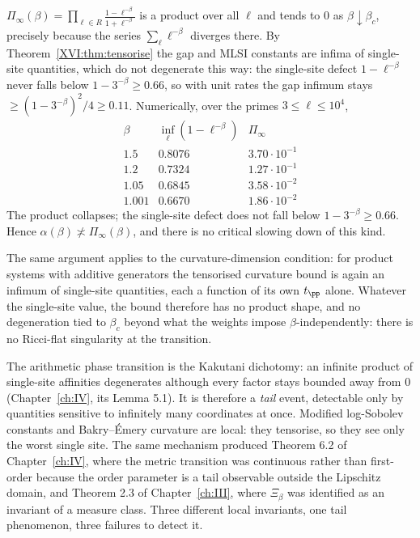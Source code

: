 \begin{corollary}\label{XVI:cor:wrongshape}
$\Pi_\infty(\beta)=\prod_{\ell\in R}\frac{1-\ell^{-\beta}}{1+\ell^{-\beta}}$ is a product over
all $\ell$ and tends to $0$ as $\beta\downarrow\beta_c$, precisely because the series
$\sum_\ell\ell^{-\beta}$ diverges there. By Theorem~\ref{XVI:thm:tensorise} the gap and MLSI
constants are infima of single-site quantities, which do not degenerate this way: the
single-site defect $1-\ell^{-\beta}$ never falls below $1-3^{-\beta}\ge0.66$, so with unit
rates the gap infimum stays $\ge(1-3^{-\beta})^2/4\ge0.11$. Numerically, over the primes
$3\le\ell\le10^4$,
\[
\begin{array}{lcc}
\beta & \inf_\ell(1-\ell^{-\beta}) & \Pi_\infty\\\hline
1.5 & 0.8076 & 3.70\cdot10^{-1}\\
1.2 & 0.7324 & 1.27\cdot10^{-1}\\
1.05 & 0.6845 & 3.58\cdot10^{-2}\\
1.001 & 0.6670 & 1.86\cdot10^{-2}
\end{array}
\]
The product collapses; the single-site defect does not fall below $1-3^{-\beta}\ge0.66$.
Hence $\alpha(\beta)\not\asymp\Pi_\infty(\beta)$, and there is no critical slowing down of
this kind.
\end{corollary}

\begin{corollary}\label{XVI:cor:BE}
The same argument applies to the curvature-dimension condition: for product systems with
additive generators the tensorised curvature bound is again an infimum of single-site
quantities, each a function of its own $t_\pp$ alone. Whatever the single-site value, the
bound therefore has no product shape, and no degeneration tied to $\beta_c$ beyond what the
weights impose $\beta$-independently: there is no Ricci-flat singularity at the transition.
\end{corollary}

\begin{remark}\label{XVI:rem:invisible}
The arithmetic phase transition is the Kakutani dichotomy: an infinite product of
single-site affinities degenerates although every factor stays bounded away from $0$
(Chapter~\ref{ch:IV}, its Lemma 5.1). It is therefore a \emph{tail} event, detectable only by quantities
sensitive to infinitely many coordinates at once. Modified log-Sobolev constants and
Bakry--\'Emery curvature are local: they tensorise, so they see only the worst single site.
The same mechanism produced Theorem 6.2 of Chapter~\ref{ch:IV}, where the metric transition was
continuous rather than first-order because the order parameter is a tail observable outside
the Lipschitz domain, and Theorem 2.3 of Chapter~\ref{ch:III}, where $\Xi_\beta$ was identified as an
invariant of a measure class. Three different local invariants, one tail phenomenon, three
failures to detect it.
\end{remark}

